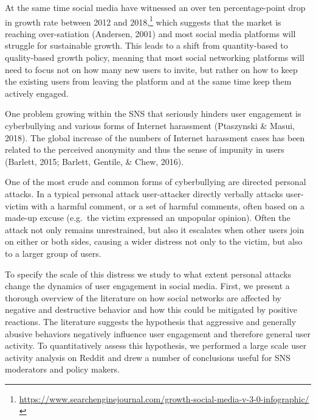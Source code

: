 \documentclass[
  10pt,
  dvipsnames]{scrartcl}
\begin{document}
At the same time social media have witnessed an over ten
percentage-point drop in growth rate between 2012 and
2018,\footnote{\url{https://www.searchenginejournal.com/growth-social-media-v-3-0-infographic/}}
which suggests that the market is reaching over-satiation (Andersen,
2001) and most social media platforms will struggle for sustainable
growth. This leads to a shift from quantity-based to quality-based
growth policy, meaning that most social networking platforms will need
to focus not on how many new users to invite, but rather on how to keep
the existing users from leaving the platform and at the same time keep
them actively engaged.

One problem growing within the SNS that seriously hinders user
engagement is cyberbullying and various forms of Internet harassment
(Ptaszynski \& Masui, 2018). The global increase of the numbers of
Internet harassment cases has been related to the perceived anonymity
and thus the sense of impunity in users (Barlett, 2015; Barlett,
Gentile, \& Chew, 2016).

One of the most crude and common forms of cyberbullying are directed
personal attacks. In a typical personal attack user-attacker directly
verbally attacks user-victim with a harmful comment, or a set of harmful
comments, often based on a made-up excuse (e.g.~the victim expressed an
unpopular opinion). Often the attack not only remains unrestrained, but
also it escalates when other users join on either or both sides, causing
a wider distress not only to the victim, but also to a larger group of
users.

To specify the scale of this distress we study to what extent personal
attacks change the dynamics of user engagement in social media. First,
we present a thorough overview of the literature on how social networks
are affected by negative and destructive behavior and how this could be
mitigated by positive reactions. The literature suggests the hypothesis
that aggressive and generally abusive behaviors negatively influence
user engagement and therefore general user activity. To quantitatively
assess this hypothesis, we performed a large scale user activity
analysis on Reddit and drew a number of conclusions useful for SNS
moderators and policy makers.
\end{document}
